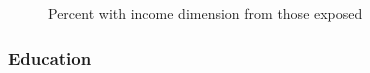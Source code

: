 \documentclass[
  letterpaper,
  DIV=11,
  numbers=noendperiod]{scrartcl}
\begin{document}
\begin{figure}[H]


\caption{\label{fig-income}Percent with income dimension from those
exposed}

\end{figure}%

\subsubsection{Education}\label{education-1}
\end{document}
